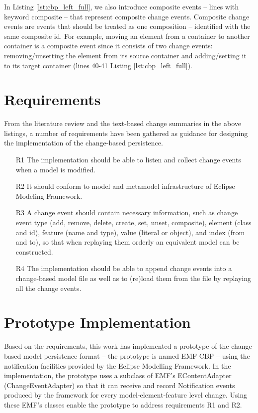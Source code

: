 In Listing \ref{lst:cbp_left_full}, we also introduce composite events -- lines with keyword \textsf{composite} -- that represent composite change events. 
Composite change events are events that should be treated as one composition -- identified with the same composite id. 
For example, moving an element from a container to another container is a composite event since it consists of two change events: 
removing/unsetting the element from its source container and adding/setting it to its target container (lines 40-41 Listing \ref{lst:cbp_left_full}). 

\section{Requirements}
\label{sec:requirements}
From the literature review and the text-based change summaries in the above listings, a number of requirements have been gathered as guidance for designing the implementation of the change-based persistence.
\begin{enumerate}
  \item[R1] The implementation should be able to listen and collect change events when a model is modified.
  \item[R2] It should conform to model and metamodel infrastructure of Eclipse Modeling Framework.
  \item[R3] A change event should contain necessary information, such as change event type (add, remove, delete, create, set, unset, composite), element (class and id), feature (name and type), value (literal or object), and index (from and to), so that when replaying them orderly an equivalent model can be constructed.
  \item[R4] The implementation should be able to append change events into a change-based model file as well as to (re)load them from the file by replaying all the change events.
\end{enumerate}
 
\section{Prototype Implementation}
\label{sec:prototype_implementation}
Based on the requirements, this work has implemented a prototype \cite{epsilonlabs2019emfcbp} of the change-based model persistence format -- the prototype is named EMF CBP -- using the notification facilities provided by the Eclipse Modelling Framework. In the implementation, the prototype uses a subclass of EMF's \textsf{EContentAdapter} (\textsf{ChangeEventAdapter}) so that it can receive and record \textsf{Notification} events produced by the framework for every model-element-feature level change. Using these EMF's classes enable the prototype to address requirements R1 and R2.


